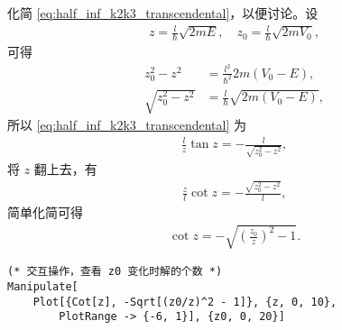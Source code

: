 化简 \eqref{eq:half_inf_k2k3_transcendental}，以便讨论。设
\begin{eqnarray}
    z = \frac{l}{\hbar} \sqrt{2mE}, \quad z_0 = \frac {l}{\hbar} \sqrt{2m V_0},\label{eq:half_inf_zz0_def}
\end{eqnarray}
可得
\begin{align}
    z_0^2 - z^2 &= \frac{l^2}{\hbar^2} 2m (V_0 - E),\\
    \sqrt{z_0^2 - z^2} &= \frac{l}{\hbar} \sqrt{2m (V_0 - E)},
\end{align}
所以 \eqref{eq:half_inf_k2k3_transcendental} 为
\begin{eqnarray}
    \frac{l}{z} \tan z = -\frac{l}{\sqrt{z_0^2 - z^2}},
\end{eqnarray}
将 $z$ 翻上去，有
\begin{eqnarray}
    \frac{z}{l} \cot z = -\frac{\sqrt{z_0^2 - z^2}}{l},
\end{eqnarray}
简单化简可得
\begin{eqnarray}
    \cot z = - \sqrt{\left(\frac{z_0}{z}\right)^2 - 1}. 
\end{eqnarray}
\begin{lstlisting}
(* 交互操作，查看 z0 变化时解的个数 *)
Manipulate[
    Plot[{Cot[z], -Sqrt[(z0/z)^2 - 1]}, {z, 0, 10}, 
        PlotRange -> {-6, 1}], {z0, 0, 20}]
\end{lstlisting}

